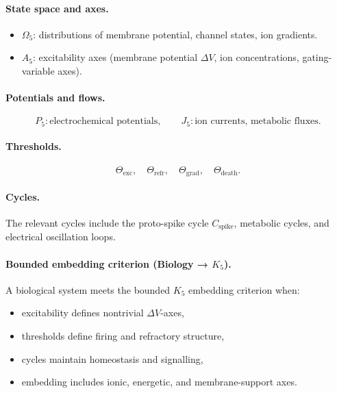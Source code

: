 \paragraph{State space and axes.}
\begin{itemize}
  \item \(\Omega_5\): distributions of membrane potential, channel states,
        ion gradients.
  \item \(A_5\): excitability axes (membrane potential \(\Delta V\), ion
        concentrations, gating-variable axes).
\end{itemize}

\paragraph{Potentials and flows.}
\[
  P_5: \text{electrochemical potentials},\qquad
  J_5: \text{ion currents, metabolic fluxes}.
\]

\paragraph{Thresholds.}
\[
  \Theta_{\mathrm{exc}},\quad
  \Theta_{\mathrm{refr}},\quad
  \Theta_{\mathrm{grad}},\quad
  \Theta_{\mathrm{death}}.
\]

\paragraph{Cycles.}
The relevant cycles include the proto-spike cycle \(C_{\mathrm{spike}}\),
metabolic cycles, and electrical oscillation loops.

\paragraph{Bounded embedding criterion (Biology → \texorpdfstring{\(K_5\)}{K5}).}
A biological system meets the bounded \(K_5\) embedding criterion when:
\begin{itemize}
  \item excitability defines nontrivial \(\Delta V\)-axes,
  \item thresholds define firing and refractory structure,
  \item cycles maintain homeostasis and signalling,
  \item embedding includes ionic, energetic, and membrane-support axes.
\end{itemize}

